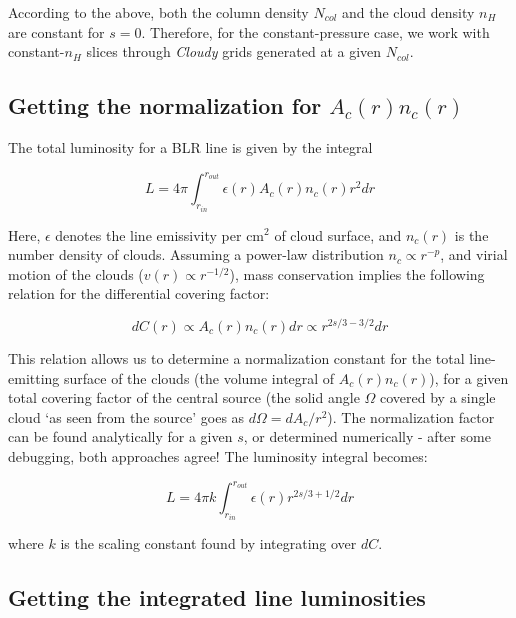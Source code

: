 \documentclass[paper=a4, fontsize=11pt]{scrartcl} %
\numberwithin{equation}{section} %
\numberwithin{figure}{section} %
\numberwithin{table}{section} %
\begin{document}
According to the above, both the column density $N_{col}$ and the cloud density $n_H$ are constant for $s=0$. Therefore, for the constant-pressure case, we work with constant-$n_H$ slices through \emph{Cloudy} grids generated at a given $N_{col}$.

\subsection{Getting the normalization for $A_c(r)n_c(r)$}

The total luminosity for a BLR line is given by the integral

\begin{equation*}
L=4\pi\int_{r_{in}}^{r_{out}}\epsilon(r)A_c(r)n_c(r)r^2dr
\end{equation*}

Here, $\epsilon$ denotes the line emissivity per cm$^2$ of cloud surface, and $n_c(r)$ is the number density of clouds. Assuming a power-law distribution $n_c\propto r^{-p}$, and virial motion of the clouds ($v(r)\propto r^{-1/2}$), mass conservation implies the following relation for the differential covering factor:

\begin{equation*}
dC(r) \propto A_c(r)n_c(r) dr \propto r^{2s/3-3/2} dr
\end{equation*}

This relation allows us to determine a normalization constant for the total line-emitting surface of the clouds (the volume integral of $A_c(r)n_c(r)$), for a given total covering factor of the central source (the solid angle $\Omega$ covered by a single cloud `as seen from the source' goes as $d\Omega=dA_c/r^2$). The normalization factor can be found analytically for a given $s$, or determined numerically - after some debugging, both approaches agree! The luminosity integral becomes:

\begin{equation*}
L=4\pi k\int_{r_{in}}^{r_{out}}\epsilon(r)r^{2s/3+1/2}dr
\end{equation*}

where $k$ is the scaling constant found by integrating over $dC$.\\

\subsection{Getting the integrated line luminosities}
\end{document}
